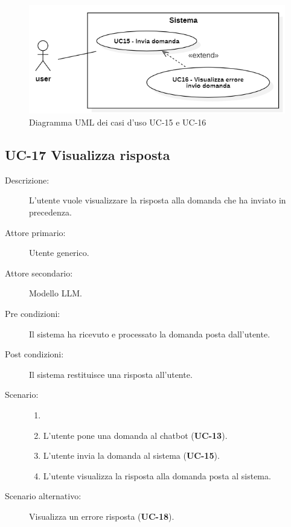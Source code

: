 \begin{figure}[H]
    \centering
    \includegraphics[width=\linewidth]{UC15-16.png} %
    \caption{Diagramma UML dei casi d'uso UC-15 e UC-16}
    \label{fig:UC18-19}
\end{figure}

\subsection{UC-17 Visualizza risposta}
\begin{description}
    \item[Descrizione:] L'utente vuole visualizzare la risposta alla domanda che ha inviato in precedenza.
    \item[Attore primario:] Utente generico.
    \item[Attore secondario:] Modello LLM. 
    \item[Pre condizioni:] Il sistema ha ricevuto e processato la domanda posta dall'utente.
    \item[Post condizioni:] Il sistema restituisce una risposta all'utente.
    \item[Scenario:]
    \begin{enumerate}
        \item[]
        \item L’utente pone una domanda al chatbot (\textbf{UC-13}).
        \item L'utente invia la domanda al sistema (\textbf{UC-15}).
        \item L'utente visualizza la risposta alla domanda posta al sistema.
    \end{enumerate}
    \item[Scenario alternativo:] Visualizza un errore risposta (\textbf{UC-18}).
\end{description}

